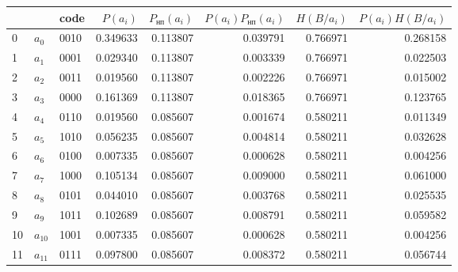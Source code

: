 \begin{tabular}{lllrrrrr}
\toprule
 &  & code & $P(a_i)$ & $P_{\text{нп}}(a_i)$ & $P(a_i)P_{\text{нп}}(a_i)$ & $H(B/a_i)$ & $P(a_i)H(B/a_i)$ \\
\midrule
0 & $a_{0}$ & 0010 & 0.349633 & 0.113807 & 0.039791 & 0.766971 & 0.268158 \\
1 & $a_{1}$ & 0001 & 0.029340 & 0.113807 & 0.003339 & 0.766971 & 0.022503 \\
2 & $a_{2}$ & 0011 & 0.019560 & 0.113807 & 0.002226 & 0.766971 & 0.015002 \\
3 & $a_{3}$ & 0000 & 0.161369 & 0.113807 & 0.018365 & 0.766971 & 0.123765 \\
4 & $a_{4}$ & 0110 & 0.019560 & 0.085607 & 0.001674 & 0.580211 & 0.011349 \\
5 & $a_{5}$ & 1010 & 0.056235 & 0.085607 & 0.004814 & 0.580211 & 0.032628 \\
6 & $a_{6}$ & 0100 & 0.007335 & 0.085607 & 0.000628 & 0.580211 & 0.004256 \\
7 & $a_{7}$ & 1000 & 0.105134 & 0.085607 & 0.009000 & 0.580211 & 0.061000 \\
8 & $a_{8}$ & 0101 & 0.044010 & 0.085607 & 0.003768 & 0.580211 & 0.025535 \\
9 & $a_{9}$ & 1011 & 0.102689 & 0.085607 & 0.008791 & 0.580211 & 0.059582 \\
10 & $a_{10}$ & 1001 & 0.007335 & 0.085607 & 0.000628 & 0.580211 & 0.004256 \\
11 & $a_{11}$ & 0111 & 0.097800 & 0.085607 & 0.008372 & 0.580211 & 0.056744 \\
\bottomrule
\end{tabular}
